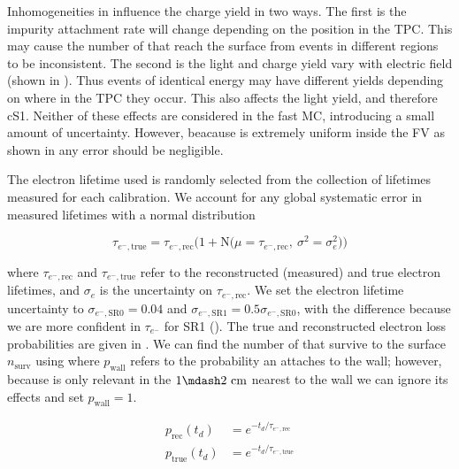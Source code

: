 Inhomogeneities in \ed influence the charge yield in two ways.  The first is the impurity attachment rate will change depending on the
position in the TPC.   This may cause the number of \electron that reach the surface from events in different regions to be
inconsistent.  The second is the light and charge yield vary with electric field (shown in
).  Thus events of identical energy may have
different yields depending on where in the TPC they occur.  This also affects the light yield, and therefore cS1.  Neither of these
effects are considered
in the fast MC, introducing a small amount of uncertainty.  However, beacause \ed is extremely uniform inside the FV as shown in
 any error should be negligible.

The electron lifetime used is randomly selected from the collection of lifetimes measured for each calibration.  We account for any global
systematic error in measured lifetimes  with a normal distribution

\begin{equation}
\tau_{e^-, \mathrm{true}} = \tau_{e^-, \mathrm{rec}} \Big( 1 + \mathrm{N} \big( \mu = \tau_{e^-, \mathrm{rec}},\ \sigma^2 = \sigma_{e}^2
\big) \Big)
\end{equation}

\noindent where $\tau_{e^-, \mathrm{rec}}$ and $\tau_{e^-, \mathrm{true}}$ refer to the reconstructed (measured) and true electron
lifetimes, and $\sigma_e$ is the uncertainty on $\tau_{e^-, \mathrm{rec}}$.  We set the electron lifetime uncertainty to 
$\sigma_{e^-, \mathrm{SR0}} = 0.04$ and $\sigma_{e^-, \mathrm{SR1}} = 0.5 \sigma_{e^-, \mathrm{SR0}}$, with the difference because we are
more
confident in $\tau_{e^-}$ for SR1 ().  The true and reconstructed electron loss probabilities
are given in
.  We can find the number of \electron that survive to the surface
$n_{\mathrm{surv}}$ using  where $p_{\mathrm{wall}}$ refers to
the probability an \electron attaches to the wall; however, because is only relevant in the $1 \mdash 2\ \mathrm{cm}$ nearest to the wall
we can ignore its effects and set $p_{\mathrm{wall}} = 1$.


\begin{equation}
\begin{aligned}
p_{\mathrm{rec}} (t_d) &= e^{-t_d / \tau_{e^-, \mathrm{rec}}} \\
p_{\mathrm{true}} (t_d) &= e^{-t_d / \tau_{e^-, \mathrm{true}}}
\end{aligned}
\label{eq:er_nr_calibrations_parameter_determ_det_phys_prob_elifetime}
\end{equation}

